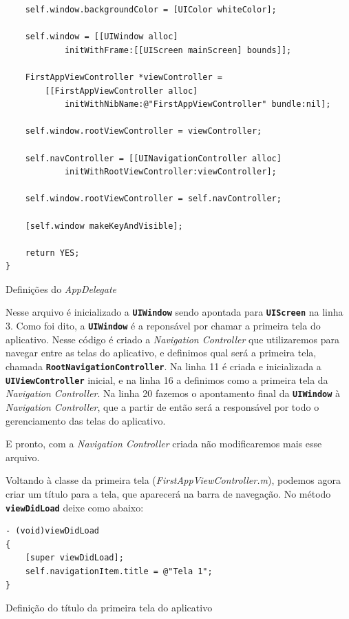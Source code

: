 \documentclass[a4paper,12pt,brazil,doubleside]{book}
\begin{document}
\begin{singlespace}
\begin{listing}[H]
\begin{verbatim}
    self.window.backgroundColor = [UIColor whiteColor];
    
    self.window = [[UIWindow alloc] 
    		initWithFrame:[[UIScreen mainScreen] bounds]];
    
    FirstAppViewController *viewController =
    	[[FirstAppViewController alloc] 
    		initWithNibName:@"FirstAppViewController" bundle:nil];
    
    self.window.rootViewController = viewController;

    self.navController = [[UINavigationController alloc] 
    		initWithRootViewController:viewController];
    
    self.window.rootViewController = self.navController;
    
    [self.window makeKeyAndVisible];
    
    return YES;
}
\end{verbatim}
\caption{Definições do \emph{AppDelegate}}
\end{listing}


Nesse arquivo é inicializado a \texttt{\textbf{UIWindow}} sendo apontada para \texttt{\textbf{UIScreen}} na linha 3. Como foi dito, a \texttt{\textbf{UIWindow}} é a reponsável por chamar a primeira tela do aplicativo. Nesse código é criado a \emph{Navigation Controller} que utilizaremos para navegar entre as telas do aplicativo, e definimos qual será a primeira tela, chamada \texttt{\textbf{RootNavigationController}}. Na linha 11 é criada e inicializada a \texttt{\textbf{UIViewController}} inicial, e na linha 16 a definimos como a primeira tela da \emph{Navigation Controller}. Na linha 20 fazemos o apontamento final da \texttt{\textbf{UIWindow}} à \emph{Navigation Controller}, que a partir de então será a responsável por todo o gerenciamento das telas do aplicativo.

E pronto, com a \emph{Navigation Controller} criada não modificaremos mais esse arquivo.

Voltando à classe da primeira tela (\emph{FirstAppViewController.m}), podemos agora criar um título para a tela, que aparecerá na barra de navegação. No método \texttt{\textbf{viewDidLoad}} deixe como abaixo:

\begin{listing}[H]
\begin{verbatim}
- (void)viewDidLoad
{
    [super viewDidLoad];
    self.navigationItem.title = @"Tela 1";
}
\end{verbatim}
\caption{Definição do título da primeira tela do aplicativo}
\end{listing}



\end{singlespace}
\end{document}
